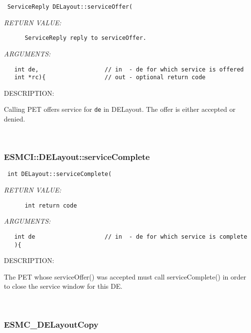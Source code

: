   
\begin{verbatim} ServiceReply DELayout::serviceOffer(\end{verbatim}{\em RETURN VALUE:}
\begin{verbatim}      ServiceReply reply to serviceOffer.\end{verbatim}{\em ARGUMENTS:}
\begin{verbatim}   int de,                   // in  - de for which service is offered
   int *rc){                 // out - optional return code\end{verbatim}
{\sf DESCRIPTION:\\ }


      Calling PET offers service for {\tt de} in DELayout. The
      offer is either accepted or denied.
   
 
\mbox{}\hrulefill\
 
\subsubsection [ESMCI::DELayout::serviceComplete] {ESMCI::DELayout::serviceComplete}


  
\begin{verbatim} int DELayout::serviceComplete(\end{verbatim}{\em RETURN VALUE:}
\begin{verbatim}      int return code\end{verbatim}{\em ARGUMENTS:}
\begin{verbatim}   int de                    // in  - de for which service is complete
   ){\end{verbatim}
{\sf DESCRIPTION:\\ }


      The PET whose serviceOffer() was accepted must call serviceComplete() in
      order to close the service window for this DE.
   
 
\mbox{}\hrulefill\
 
\subsubsection [ESMC\_DELayoutCopy] {ESMC\_DELayoutCopy}


